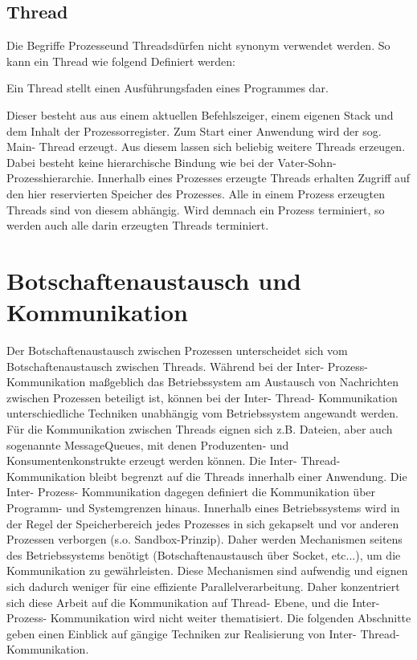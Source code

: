 \documentclass[12pt,oneside,a4paper,bibtotoc,liststotoc]{scrreprt}
\begin{document}
\subsection{Thread}
Die Begriffe \glqq Prozesse\grqq und \glqq Threads\grqq dürfen nicht synonym verwendet werden. So kann ein Thread wie folgend Definiert werden:
\begin{center}
Ein Thread stellt einen Ausführungsfaden
eines Programmes dar.
\end{center}
Dieser besteht aus aus einem aktuellen Befehlszeiger, einem eigenen Stack und dem Inhalt der Prozessorregister. Zum Start einer Anwendung wird der sog. Main- Thread erzeugt. Aus diesem lassen sich beliebig weitere Threads erzeugen. Dabei besteht keine hierarchische Bindung wie bei der Vater-Sohn- Prozesshierarchie. Innerhalb eines Prozesses erzeugte Threads erhalten Zugriff auf den hier reservierten Speicher des Prozesses. Alle in einem Prozess erzeugten Threads sind von diesem abhängig. Wird demnach ein Prozess terminiert, so werden auch alle darin erzeugten Threads terminiert.

\section{Botschaftenaustausch und Kommunikation}
Der Botschaftenaustausch zwischen Prozessen unterscheidet sich vom Botschaftenaustausch zwischen Threads. Während bei der Inter- Prozess- Kommunikation maßgeblich das Betriebssystem am Austausch von Nachrichten zwischen Prozessen beteiligt ist, können bei der Inter- Thread- Kommunikation unterschiedliche Techniken unabhängig vom Betriebssystem angewandt werden. Für die Kommunikation zwischen Threads eignen sich z.B. Dateien, aber auch sogenannte MessageQueues, mit denen Produzenten- und Konsumentenkonstrukte erzeugt werden können. Die Inter- Thread- Kommunikation bleibt begrenzt auf die Threads innerhalb einer Anwendung. Die Inter- Prozess- Kommunikation dagegen definiert die Kommunikation über Programm- und Systemgrenzen hinaus. Innerhalb eines Betriebssystems wird in der Regel der Speicherbereich jedes Prozesses in sich gekapselt und vor anderen Prozessen verborgen (s.o. Sandbox-Prinzip). Daher werden Mechanismen seitens des Betriebssystems benötigt (Botschaftenaustausch über Socket, etc...), um die Kommunikation zu gewährleisten. Diese Mechanismen sind aufwendig und eignen sich dadurch weniger für eine effiziente Parallelverarbeitung. Daher konzentriert sich diese Arbeit auf die Kommunikation auf Thread- Ebene, und die Inter- Prozess- Kommunikation wird nicht weiter thematisiert. Die folgenden Abschnitte geben einen Einblick auf gängige Techniken zur Realisierung von Inter- Thread- Kommunikation.
\end{document}
